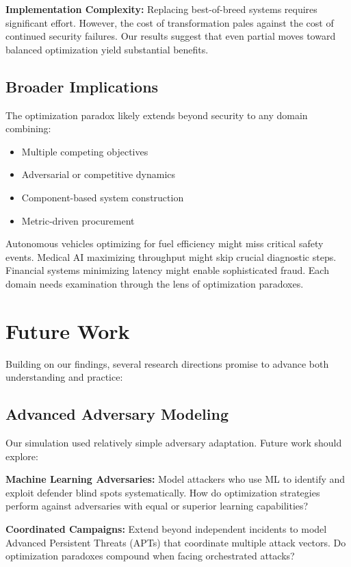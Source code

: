 \documentclass[10pt,conference]{IEEEtran}
\begin{document}
\textbf{Implementation Complexity:} Replacing best-of-breed systems requires significant effort. However, the cost of transformation pales against the cost of continued security failures. Our results suggest that even partial moves toward balanced optimization yield substantial benefits.

\subsection{Broader Implications}

The optimization paradox likely extends beyond security to any domain combining:
\begin{itemize}
\item Multiple competing objectives
\item Adversarial or competitive dynamics
\item Component-based system construction
\item Metric-driven procurement
\end{itemize}

Autonomous vehicles optimizing for fuel efficiency might miss critical safety events. Medical AI maximizing throughput might skip crucial diagnostic steps. Financial systems minimizing latency might enable sophisticated fraud. Each domain needs examination through the lens of optimization paradoxes.

\section{Future Work}

Building on our findings, several research directions promise to advance both understanding and practice:

\subsection{Advanced Adversary Modeling}

Our simulation used relatively simple adversary adaptation. Future work should explore:

\textbf{Machine Learning Adversaries:} Model attackers who use ML to identify and exploit defender blind spots systematically. How do optimization strategies perform against adversaries with equal or superior learning capabilities?

\textbf{Coordinated Campaigns:} Extend beyond independent incidents to model Advanced Persistent Threats (APTs) that coordinate multiple attack vectors. Do optimization paradoxes compound when facing orchestrated attacks?
\end{document}

